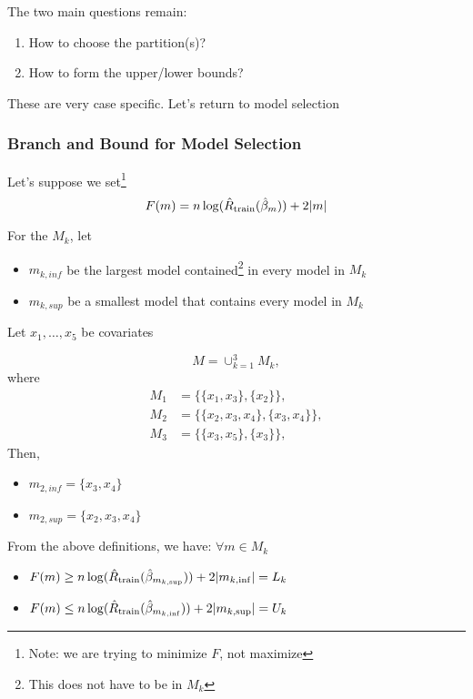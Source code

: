 \documentclass[10pt]{article}
\begin{document}
{The two main questions remain:
\begin{enumerate}
\item How to choose the partition(s)?
\item How to form the upper/lower bounds?
\end{enumerate}
These are very case specific.  Let's return to model selection

\newpage

		\subsubsection{Branch and Bound for Model Selection}
		
		Let's suppose we set\footnote{Note: we are trying to minimize $F$, not maximize}
\[
F(m) = n \log(\hat{R}_{\textrm{train}}(\hat\beta_m)) + 2|m| 
\]

For the $M_k$, let
\begin{itemize}
\item[] $m_{k,inf}$ be the largest model contained\footnote{This does not have to be in $M_k$}
 in every model in $M_k$
\item[] $m_{k,sup}$ be a smallest model that contains every model in $M_k$
\end{itemize}

	\begin{example} Let $x_1, \ldots, x_5$ be covariates

\[
M  = \cup_{k=1}^3 M_k,
\]
where
\begin{align*}
M_1 
& = \{\{x_1,x_3\}, \{x_2\} \}, \\
M_2 
& = \{\{x_2,x_3,x_4\}, \{x_3,x_4\} \}, \\
 M_3 
& = \{\{x_3,x_5\}, \{x_3\} \}, 
\end{align*}
Then,
\begin{itemize}
\item[] $m_{2,inf} = \{x_3,x_4\}$
\item[] $m_{2,sup} = \{x_2,x_3,x_4\}$
\end{itemize}

	\end{example}
	
From the above definitions, we have: $\forall m \in M_k$
\begin{itemize}
\item[] $F(m) \geq n \log(\hat{R}_{\textrm{train}}(\hat\beta_{m_{k,\sup}})) + 2|m_{k,\inf}| = L_k$  
\item[] $F(m) \leq n \log(\hat{R}_{\textrm{train}}(\hat\beta_{m_{k,\inf}})) + 2|m_{k,\sup}|  = U_k$ 
\end{itemize}


}
\end{document}
